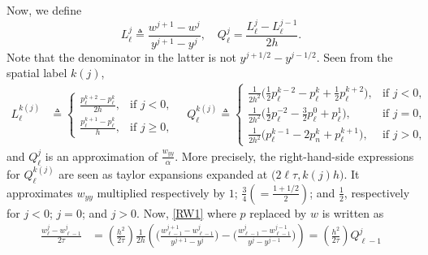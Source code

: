 \documentclass[a4paper,11pt]{article}
\def\l{{h}}
\def\Lip{{\mathrm{Lip}}}
\theoremstyle{remark}
\begin{document}
Now, we define
$$L^j_\ell \triangleq \frac{w^{j+1}-w^j}{y^{j+1}-y^j}, \quad Q^j_\ell = \frac{L^j_\ell-L^{j-1}_\ell}{2h}.$$
Note that the denominator in the latter is not $y^{j+1/2}-y^{j-1/2}$. Seen from the spatial label $k(j)$,
\begin{align*}
 L^{k(j)}_\ell &\triangleq \left\{\begin{array}{ll}
        \frac{p^{k+2} _{\ell} - p ^{k} _{\ell}}{2\l}, & \text{if $j<0$},\\
        \frac{p^{k+1} _{\ell} - p ^{k} _{\ell}}{\l}, & \text{if }  j\ge0,
        \end{array}\right. \quad Q^{k(j)}_\ell \triangleq \left\{\begin{array}{ll}
        \frac{1}{2\l^2}\Big( \frac{1}{2} p^{k-2} _{\ell} - p ^{k} _{\ell} + \frac{1}{2} p^{k+2} _{\ell}\Big), & \text{if $j<0$},\\
        \frac{1}{2\l^2}\Big( \frac{1}{2} p^{-2} _{\ell} - \frac{3}{2}p ^{0} _{\ell} +p^{1} _{\ell}\Big), & \text{if $j=0$},\\
        \frac{1}{2\l^2}\Big(p^{k-1} _{\ell} - 2p^k_n + p ^{k+1} _{\ell}\Big), & \text{if $j>0$},
        \end{array}\right.
\end{align*}
and $Q^j_\ell$ is an approximation of $\frac{w_{yy}}{\alpha}$. More precisely, the right-hand-side expressions for $Q^{k(j)}_\ell$ are seen as taylor expansions expanded at $\big(2\ell\tau,k(j)\l\big)$. It approximates $w_{yy}$ multiplied respectively by $1$; $\frac{3}{4}\left(=\tfrac{1+1/2}{2}\right)$; and $\frac{1}{2}$, respectively for $j<0$; $j=0$; and $j>0$.
Now, \eqref{RW1} where $p$ replaced by $w$ is written as
\begin{equation} \label{RW1w}
\begin{aligned}
 \frac{w^j_\ell - w^j_{\ell-1}}{2\tau} &= \left(\frac{h^2}{2\tau}\right) \frac{1}{2h}\left( \Big(\tfrac{w^{j+1}_{\ell-1} - w^{j}_{\ell-1}}{y^{j+1}-y^j}\Big) -\Big(\tfrac{w^{j}_{\ell-1} - w^{j-1}_{\ell-1}}{y^{j}-y^{j-1}} \Big)\right)= \left(\frac{h^2}{2\tau}\right)Q^j_{\ell-1}
  \end{aligned}
\end{equation}
\end{document}
